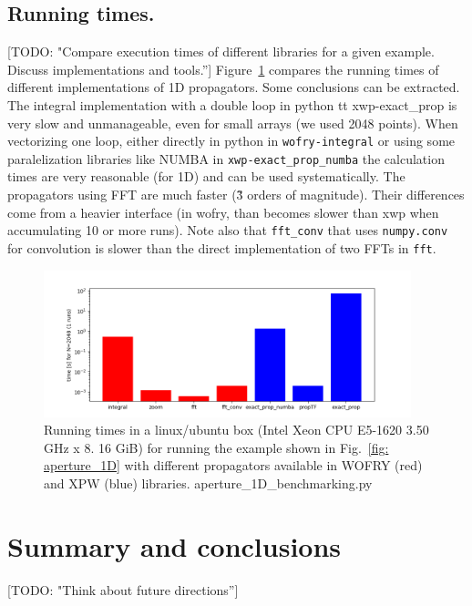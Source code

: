 \documentclass{iucr}              %
\newcommand{\todo}[1]{{\color{red}[TODO: "#1'']}}
\newcommand{\ingreen}[1]{{\color{green}#1}}
\begin{document}
\subsection{Running times.}
\todo{Compare execution times of different libraries for a given example. Discuss implementations and tools.}
Figure~\ref{fig: running times 1D} compares the running times of different implementations of 1D propagators. Some conclusions can be extracted. The integral implementation with a double loop in python {tt xwp-exact\_prop} is very slow and unmanageable, even for small arrays (we used 2048 points). When vectorizing one loop, either directly in python in {\tt wofry-integral} or using some paralelization libraries like NUMBA in {\tt xwp-exact\_prop\_numba} the calculation times are very reasonable (for 1D) and can be used systematically. The propagators using FFT are much faster (\~ 3 orders of magnitude). Their differences come from a heavier interface (in wofry, than becomes slower than xwp when accumulating 10 or more runs). Note also that {\tt fft\_conv} that uses {\tt numpy.conv} for convolution is slower than the direct implementation of two FFTs in {\tt fft}.   

\begin{figure}
\label{fig: running times 1D}
\caption{Running times in a linux/ubuntu box (Intel Xeon CPU E5-1620 3.50 GHz x 8. 16 GiB) for running the example shown in Fig.~\ref{fig: aperture_1D} with different propagators available in WOFRY (red) and XPW (blue) libraries. \ingreen{aperture\_1D\_benchmarking.py}
}
\includegraphics[width=0.95\textwidth]{aperture_1D_benchmarking.png}
\end{figure}




\section{Summary and conclusions}

\todo{Think about future directions}
\end{document}
